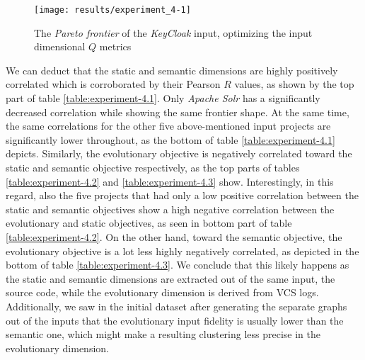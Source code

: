 \documentclass[12pt,a4paper]{report}
\begin{document}
\begin{figure}[htbp]
\centering
\texttt{[image: results/experiment\_4-1]}
\caption{The \textit{Pareto frontier} of the \textit{KeyCloak} input, optimizing the input dimensional $Q$ metrics}
\label{fig:experiment-4.1}
\end{figure}

We can deduct that the static and semantic dimensions are highly positively
correlated which is corroborated by their Pearson $R$ values, as shown by
the top part of table \ref{table:experiment-4.1}.
Only \textit{Apache Solr} has a significantly decreased correlation
while showing the same frontier shape.
At the same time, the same correlations for the other five above\hyp mentioned
input projects are significantly lower throughout, as the bottom of table
\ref{table:experiment-4.1} depicts.
Similarly, the evolutionary objective is negatively correlated toward the static
and semantic objective respectively, as the top parts of tables
\ref{table:experiment-4.2} and \ref{table:experiment-4.3} show.
Interestingly, in this regard, also the five projects that had only a low
positive correlation between the static and semantic objectives show a high
negative correlation between the evolutionary and static objectives,
as seen in bottom part of table \ref{table:experiment-4.2}.
On the other hand, toward the semantic objective, the evolutionary objective
is a lot less highly negatively correlated, as depicted in the bottom of table
\ref{table:experiment-4.3}.
We conclude that this likely happens as the static and semantic dimensions are
extracted out of the same input, the source code, while the evolutionary
dimension is derived from VCS logs. Additionally, we saw in the initial dataset
after generating the separate graphs out of the inputs that the evolutionary
input fidelity is usually lower than the semantic one, which might make a
resulting clustering less precise in the evolutionary dimension.
\end{document}
